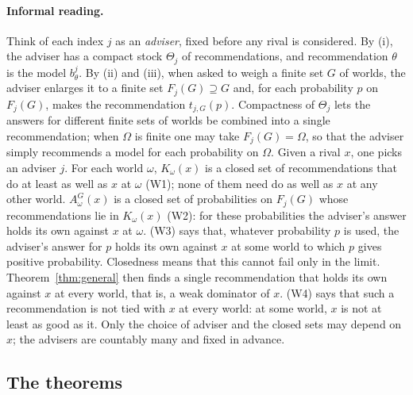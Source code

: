 \documentclass[11pt]{article}
\theoremstyle{definition}
\theoremstyle{remark}
\begin{document}
{\color{red}\paragraph{Informal reading.} Think of each index $j$ as an \emph{adviser}, fixed before any rival is considered. By (i), the adviser has a compact stock $\Theta_j$ of recommendations, and recommendation $\theta$ is the model $b^j_\theta$. By (ii) and (iii), when asked to weigh a finite set $G$ of worlds, the adviser enlarges it to a finite set $F_j(G)\supseteq G$ and, for each probability $p$ on $F_j(G)$, makes the recommendation $t_{j,G}(p)$. Compactness of $\Theta_j$ lets the answers for different finite sets of worlds be combined into a single recommendation; when $\Omega$ is finite one may take $F_j(G)=\Omega$, so that the adviser simply recommends a model for each probability on $\Omega$. Given a rival $x$, one picks an adviser $j$. For each world $\omega$, $K_\omega(x)$ is a closed set of recommendations that do at least as well as $x$ at $\omega$ (W1); none of them need do as well as $x$ at any other world. $A^G_\omega(x)$ is a closed set of probabilities on $F_j(G)$ whose recommendations lie in $K_\omega(x)$ (W2): for these probabilities the adviser's answer holds its own against $x$ at $\omega$. (W3) says that, whatever probability $p$ is used, the adviser's answer for $p$ holds its own against $x$ at some world to which $p$ gives positive probability. Closedness means that this cannot fail only in the limit. Theorem~\ref{thm:general} then finds a single recommendation that holds its own against $x$ at every world, that is, a weak dominator of $x$. (W4) says that such a recommendation is not tied with $x$ at every world: at some world, $x$ is not at least as good as it. Only the choice of adviser and the closed sets may depend on $x$; the advisers are countably many and fixed in advance.}

\subsection{The theorems}
\end{document}
